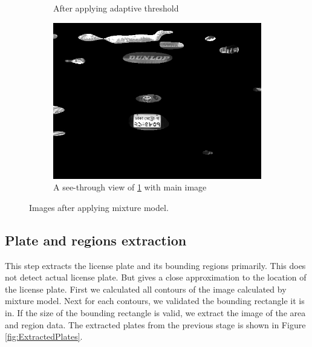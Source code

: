\documentclass{standalone}
\begin{document}
\begin{figure}
\begin{subfigure}{.5\textwidth}
  \caption{After applying adaptive threshold}
  \label{fig:ThresholdMixtureModel}
\end{subfigure}
\begin{subfigure}{.5\textwidth}
  \centering
  \includegraphics[width=.8\linewidth]{./img/sample/stage5-2.jpg}
  \caption{A see-through view of \ref{fig:ThresholdMixtureModel} with main image}
  \label{fig:GlassViewMixtureModel}
\end{subfigure}
\caption{Images after applying mixture model.}
\label{fig:MixtureModel}
\end{figure}


\subsection{Plate and regions extraction}
This step extracts the license plate and its bounding regions primarily. This does not detect actual license plate. But gives a close approximation to the location of the license plate. First we calculated all contours of the image calculated by mixture model. Next for each contours, we validated the bounding rectangle it is in. If the size of the bounding rectangle is valid, we extract the image of the area and region data. The extracted plates from the previous stage is shown in Figure \ref{fig:ExtractedPlates}.
\end{document}
